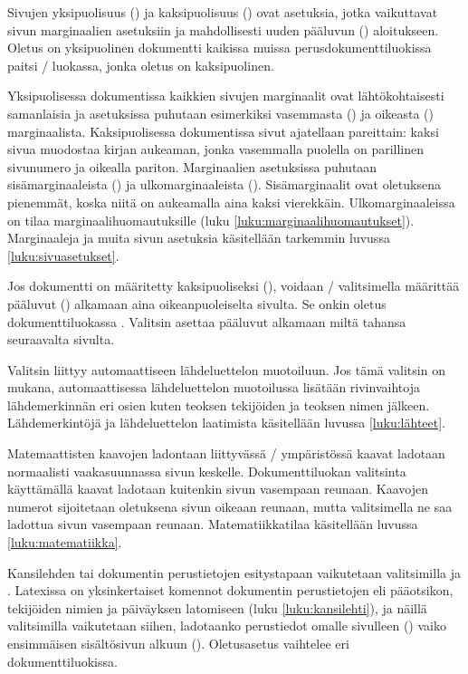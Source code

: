 Sivujen yksipuolisuus () ja kaksipuolisuus
() ovat asetuksia, jotka vaikuttavat sivun marginaalien
asetuksiin ja mahdollisesti uuden pääluvun ()
aloitukseen. Oletus on yksipuolinen dokumentti kaikissa muissa
perusdokumenttiluokissa paitsi \-/ luokassa, jonka oletus
on kaksipuolinen.

Yksipuolisessa dokumentissa kaikkien sivujen marginaalit ovat
lähtökohtaisesti samanlaisia ja asetuksissa puhutaan esimerkiksi
vasemmasta () ja oikeasta ()
marginaalista. Kaksipuolisessa dokumentissa sivut ajatellaan pareittain:
kaksi sivua muodostaa kirjan aukeaman, jonka vasemmalla puolella on
parillinen sivunumero ja oikealla pariton. Marginaalien asetuksissa
puhutaan sisämarginaaleista () ja ulkomarginaaleista
(). Sisämarginaalit ovat oletuksena pienemmät, koska
niitä on aukeamalla aina kaksi vierekkäin. Ulkomarginaaleissa on tilaa
marginaalihuomautuksille (luku \ref{luku:marginaalihuomautukset}).
Marginaaleja ja muita sivun asetuksia käsitellään tarkemmin luvussa
\ref{luku:sivuasetukset}.

Jos dokumentti on määritetty kaksipuoliseksi (), voidaan
\-/ valitsimella määrittää pääluvut
() alkamaan aina oikeanpuoleiselta sivulta. Se onkin
oletus dokumenttiluokassa . Valitsin 
asettaa pääluvut alkamaan miltä tahansa seuraavalta sivulta.

Valitsin  liittyy automaattiseen lähdeluettelon
muotoiluun. Jos tämä valitsin on mukana, automaattisessa lähdeluettelon
muotoilussa lisätään rivinvaihtoja lähdemerkinnän eri osien kuten
teoksen tekijöiden ja teoksen nimen jälkeen. Lähdemerkintöjä ja
lähdeluettelon laatimista käsitellään luvussa \ref{luku:lähteet}.

Matemaattisten kaavojen ladontaan liittyvässä \-/
ympäristössä kaavat ladotaan normaalisti vaakasuunnassa sivun keskelle.
Dokumenttiluokan valitsinta  käyttämällä kaavat ladotaan
kuitenkin sivun vasempaan reunaan. Kaavojen numerot sijoitetaan
oletuksena sivun oikeaan reunaan, mutta valitsimella  ne
saa ladottua sivun vasempaan reunaan. Matematiikkatilaa käsitellään
luvussa \ref{luku:matematiikka}.

Kansilehden tai dokumentin perustietojen esitystapaan vaikutetaan
valitsimilla  ja . Latexissa
on yksinkertaiset komennot dokumentin perustietojen eli pääotsikon,
tekijöiden nimien ja päiväyksen latomiseen (luku \ref{luku:kansilehti}),
ja näillä valitsimilla vaikutetaan siihen, ladotaanko perustiedot omalle
sivulleen () vaiko ensimmäisen sisältösivun alkuun
(). Oletus\-asetus vaihtelee eri
dokumenttiluokissa.

